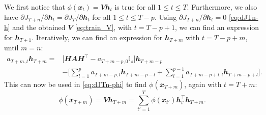 We first notice that $\phi\left(\mathbfit{x}_t\right) = \mathbfit{V}\mathbfit{h}_t$ is true for all $1 \leq t \leq T$. Furthermore, we also have $\partial{J_{T+n}} / \partial \mathbfit{h}_{t} = \partial{J_{T}} / \partial \mathbfit{h}_{t}$ for all $1 \leq t \leq T-p$. Using $\partial{J_{T+n}} / \partial \mathbfit{h}_{t} = 0$ \eqref{eq:dJTn-h} and the obtained $\mathbfit{V}$ \eqref{eq:train_V}, with $t = T - p + 1$, we can find an expression for $\mathbfit{h}_{T+1}$. Iteratively, we can find an expression for $\mathbfit{h}_{T+m}$ with $t = T-p+m$, until $m=n$:
\begin{align}
	a_{T+m,t}\mathbfit{h}_{T+m} = & \Big[\mathbfit{H}\mathbfit{A}\mathbfit{H}^{\top}
	- a_{T+m-p,0}\mathbb{I}_{s}\Big]\mathbfit{h}_{T+m-p} \label{eq:pred_forward_hn+i+1} \\
	                        & - \Big[
	\sum_{l=1} ^{p} a_{T+m-p,l}\mathbfit{h}_{T+m-p-l} +\sum_{l=1} ^{p-1}a_{T+m-p+l,l}\mathbfit{h}_{T+m-p+l} \big].\nonumber
\end{align}
This can now be used in \eqref{eq:dJTn-phi} to find $\phi\left(\mathbfit{x}_{T+m}\right)$, again with $t=T+m$:
\begin{equation}
	\phi(\mathbfit{x}_{T+m})=\mathbfit{V}\mathbfit{h}_{T+m}= \sum_{t'=1}^{T} \phi(\mathbfit{x}_{t'}) \mathbfit{h}_{t'}^{\top}\mathbfit{h}_{T+m}.    \label{eq:pred_xn+1_hn+1_duality}
\end{equation}
% 
